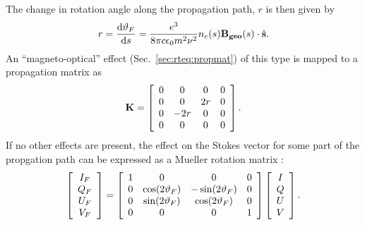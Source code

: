 The change in rotation angle along the propagation path, $r$ is then given by
\begin{equation}
  r=\frac{\mathrm{d} \vartheta_{F}}{\mathrm{d} s}=\frac{e^{3}}{8\pi 
    c\epsilon_{0}m^{2}\nu^{2}}n_{e}(s) {\bf B_{geo}} (s) \cdot 
    \hat{\bf s}. 
 \label{eq:faraday:speed}
\end{equation}
An ``magneto-optical'' effect (Sec.~\ref{sec:rteq:propmat}) of this type is
mapped to a propagation matrix as 
\begin{equation}
 {\bf K} = \left[
\begin{array}{cccc}
0 & 0 & 0 & 0 \\
0 & 0 & 2r & 0 \\
0 & -2r & 0  & 0\\
0 & 0 & 0 & 0\\
\end{array}
\right].
\label{eq:faraday:propmat}
\end{equation}
If no other effects are present, the effect on the Stokes vector for some part
of the propgation path can be expressed as a Mueller rotation matrix
\citep{goldstein:polar:03,meissner:06:polar}:
\begin{equation}
\left[
\begin{array}{c}
I_{F}\\
Q_{F}\\
U_{F}\\
V_{F}\\
\end{array}
\right]
= \left[
\begin{array}{cccc}
1 & 0 & 0 & 0 \\
0 & \cos(2\vartheta_{F}) & -\sin(2\vartheta_{F}) & 0 \\
0 & \sin(2\vartheta_{F}) & \cos(2\vartheta_{F}) & 0\\
0 & 0 & 0 & 1\\
\end{array}
\right]
\left[
\begin{array}{c}
I\\
Q\\
U\\
V\\
\end{array}
\right].
\label{eq:faraday:mueller}
\end{equation}



